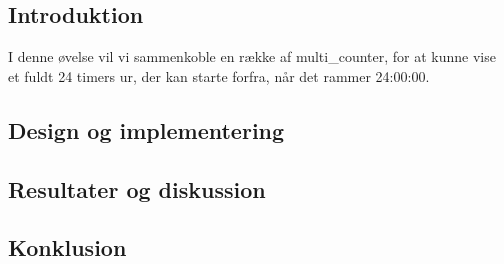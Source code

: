 \documentclass[../journal.tex]{subfiles}
\begin{document}
\subsection{Introduktion}

I denne øvelse vil vi sammenkoble en række af multi\_counter, for at kunne vise et fuldt 24 timers ur, der kan starte forfra, når det rammer 24:00:00. 

\subsection{Design og implementering}





\subsection{Resultater og diskussion}

\subsection{Konklusion}
\end{document}
